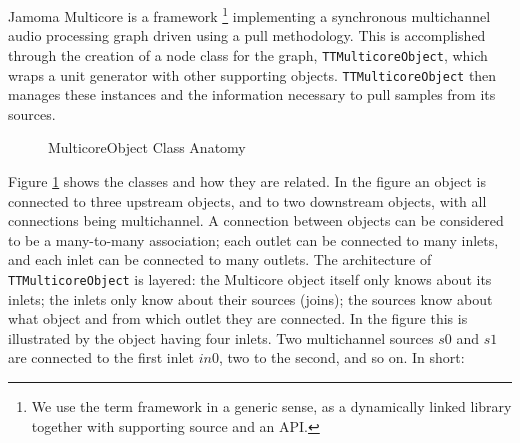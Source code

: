 \documentclass[twoside,a4paper]{article}
\begin{document}
Jamoma Multicore is a framework \footnote{We use the term framework in a generic sense, as a dynamically linked library together with supporting source and an API.} implementing a synchronous multichannel audio processing graph driven using a pull methodology.  This is accomplished through the creation of a node class for the graph, \texttt{TTMulticoreObject}, which wraps a unit generator with other supporting objects.  \texttt{TTMulticoreObject} then manages these instances and the information necessary to pull samples from its sources.

\begin{figure}[htbp]
\centerline{}
\caption{MulticoreObject Class Anatomy}
\label{fig:anatomy}
\end{figure}

Figure \ref{fig:anatomy} shows the classes and how they are related. In the figure an object is connected to three upstream objects, and to two downstream objects, with all connections being multichannel.  A connection between objects can be considered to be a many-to-many association; each outlet can be connected to many inlets, and each inlet can be connected to many outlets. The architecture of \texttt{TTMulticoreObject} is layered: the Multicore object itself only knows about its inlets; the inlets only know about their sources (joins); the sources know about what object and from which outlet they are connected. In the figure this is illustrated by the object having four inlets. Two multichannel sources $s0$ and $s1$ are connected to the first inlet $in0$, two to the second, and so on. In short:
\end{document}
